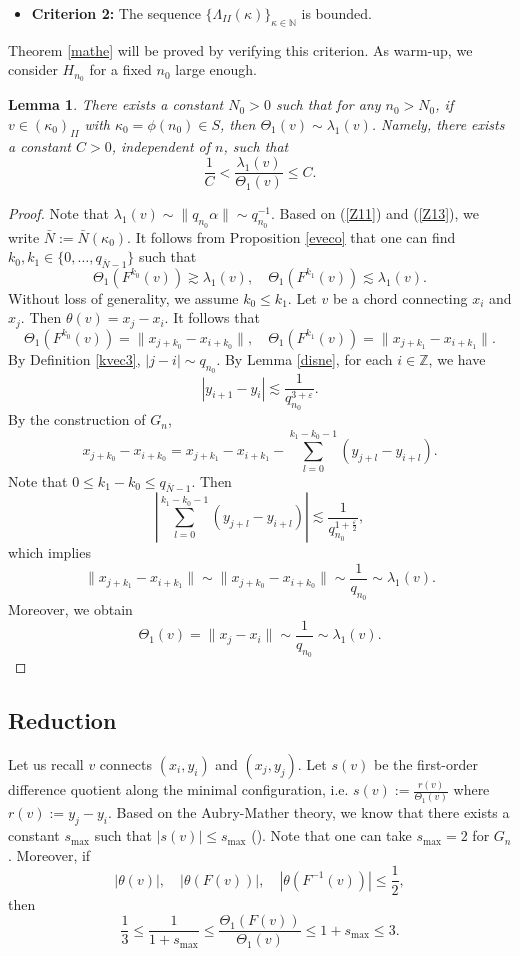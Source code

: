 \documentclass{amsart}
\newcounter{item}[section]
\newtheorem{Lemma}[Definition]{Lemma}
\theoremstyle{definition}
\begin{document}
\begin{itemize}
	\item {\bf Criterion 2:}    The sequence $\{\Lambda_{II}(\kappa)\}_{\kappa\in \mathbb{N}}$ is  bounded.
\end{itemize}

Theorem \ref{mathe} will be proved by verifying this criterion.   As warm-up, we consider $H_{n_0}$ for a fixed $n_0$ large enough.
\begin{Lemma}\label{initi}
There exists a constant $N_0 > 0$ such that for any $n_0 > N_0$, if $v \in (\kappa_0)_{II}$ with $\kappa_0 = \phi(n_0) \in S$, then $\Theta_1(v) \sim \lambda_1(v)$. Namely, there exists a constant $C > 0$, independent of $n$, such that
\[
\frac{1}{C} < \frac{\lambda_1(v)}{\Theta_1(v)} \leq C.
\]
\end{Lemma}
\begin{proof}
Note that $\lambda_1(v)\sim\|q_{n_0}\alpha\|\sim q_{n_0}^{-1}$. Based on (\ref{Z11}) and (\ref{Z13}), we write $\bar{N}:=\bar{N}(\kappa_0)$. It follows from Proposition \ref{eveco} that one can find $k_0,k_1\in \{0,\ldots,q_{\bar{N}-1}\}$ such that
\[\Theta_1(F^{k_0}(v))\gtrsim \lambda_1(v),\quad  \Theta_1(F^{k_1}(v))\lesssim\lambda_1(v).\]
Without loss of generality, we assume $k_0\leq k_1$.
Let $v$ be a chord connecting $x_i$ and $x_j$. Then $\theta(v)=x_j-x_i$. It follows that
\[\Theta_1(F^{k_0}(v))=\|x_{j+k_0}-x_{i+k_0}\|,\quad \Theta_1(F^{k_1}(v))=\|x_{j+k_1}-x_{i+k_1}\|.\]
By Definition \ref{kvec3}, $|j-i|\sim q_{n_0}$.
By Lemma \ref{disne}, for each $i\in \mathbb{Z}$, we have
\[|y_{i+1}-y_i|\lesssim \frac{1}{q_{n_0}^{3+\varepsilon}}.\]
By the construction of $G_n$,
\[x_{j+k_0}-x_{i+k_0}=x_{j+k_1}-x_{i+k_1}-\sum_{l=0}^{k_1-k_0-1}(y_{j+l}-y_{i+l}).\]
Note that $0\leq k_1-k_0\leq q_{\bar{N}-1}$. Then
\begin{equation}\label{i-jrole}
\left|\sum_{l=0}^{k_1-k_0-1}(y_{j+l}-y_{i+l})\right|\lesssim \frac{1}{q_{n_0}^{1+\frac{\varepsilon}{2}}},
\end{equation}
which implies
\[\|x_{j+k_1}-x_{i+k_1}\|\sim\|x_{j+k_0}-x_{i+k_0}\|\sim \frac{1}{q_{n_0}}\sim\lambda_1(v).\]
Moreover, we obtain  \[\Theta_1(v)=\|x_j-x_i\|\sim\frac{1}{q_{n_0}}\sim \lambda_1(v).\]
\end{proof}

\subsection{Reduction}
Let us recall  $v$ connects $(x_i,y_i)$ and  $(x_j,y_j)$. Let $s(v)$ be the first-order difference quotient along the minimal configuration, i.e. $s(v):=\frac{r(v)}{\Theta_1(v)}$ where $r(v):=y_j-y_i$. Based on the Aubry-Mather theory, we know that there exists a constant $s_{\max}$ such that $|s(v)|\leq s_{\max}$ (\cite[Theorem 14.1]{FoM}).  Note that one can take $s_{\max}=2$ for $G_n$.  Moreover, if
\[|\theta(v)|,\quad |\theta(F(v))|,\quad |\theta(F^{-1}(v))|\leq \frac{1}{2},\]
then
\begin{equation}\label{boud}
\frac{1}{3}\leq \frac{1}{1+s_{\max}}\leq \frac{\Theta_1(F(v))}{\Theta_1(v)}\leq 1+s_{\max}\leq 3.
\end{equation}
\end{document}
